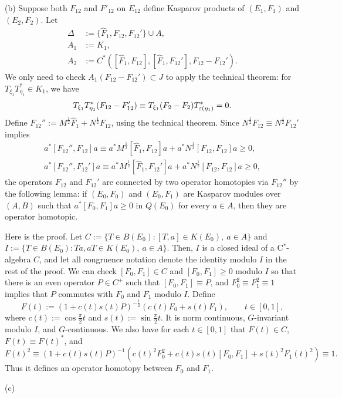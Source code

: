 \documentclass{../../large}
\begin{document}
\begin{pf}
(b)
Suppose both $F_{12}$ and $F'_{12}$ on $E_{12}$ define Kasparov products of $(E_1,F_1)$ and $(E_2,F_2)$.
Let
\begin{align*}
\Delta&:=\{\hat F_1,F_{12},F_{12}'\}\cup A,\\
A_1&:=K_1,\\
A_2&:=C^*([\hat F_1,F_{12}],[\hat F_1,F_{12}'],F_{12}-F_{12}').
\end{align*}
We only need to check $A_1(F_{12}-F_{12}')\subset J$ to apply the technical theorem: for $T_{\xi_1}T_{\eta_1}^*\in K_1$, we have
\[T_{\xi_1}T_{\eta_1}^*(F_{12}-F_{12}')\equiv T_{\xi_1}(F_2-F_2)T_{\varepsilon(\eta_1)}^*=0.\]
Define $F_{12}'':=M^{\frac12}\hat F_1+N^{\frac12}F_{12}$, using the technical theorem.
Since $N^{\frac12}F_{12}\equiv N^{\frac12}F_{12}'$ implies
\begin{align*}
a^*[F_{12}'',F_{12}]a\equiv a^*M^{\frac12}[\hat F_1,F_{12}]a+a^*N^{\frac12}[F_{12},F_{12}]a\ge0,\\
a^*[F_{12}'',F_{12}']a\equiv a^*M^{\frac12}[\hat F_1,F_{12}']a+a^*N^{\frac12}[F_{12},F_{12}]a\ge0,
\end{align*}
the operators $F_{12}$ and $F_{12}'$ are connected by two operator homotopies via $F_{12}''$ by the following lemma: if $(E_0,F_0)$ and $(E_0,F_1)$ are Kasparov modules over $(A,B)$ such that $a^*[F_0,F_1]a\ge0$ in $Q(E_0)$ for every $a\in A$, then they are operator homotopic.



Here is the proof.
Let $C:=\{T\in B(E_0):[T,a]\in K(E_0),\ a\in A\}$ and $I:=\{T\in B(E_0):Ta,aT\in K(E_0),\ a\in A\}$.
Then, $I$ is a closed ideal of a C$^*$-algebra $C$, and let all congruence notation denote the identity modulo $I$ in the rest of the proof.
We can check $[F_0,F_1]\in C$ and $[F_0,F_1]\ge0$ modulo $I$ so that there is an even operator $P\in C^+$ such that $[F_0,F_1]\equiv P$, and $F_0^2\equiv F_1^2\equiv 1$ implies that $P$ commutes with $F_0$ and $F_1$ modulo $I$.
Define
\[F(t):=(1+c(t)s(t)P)^{-\frac12}(c(t)F_0+s(t)F_1),\qquad t\in[0,1],\]
where $c(t):=\cos\frac\pi2t$ and $s(t):=\sin\frac\pi2t$.
It is norm continuous, $G$-invariant modulo $I$, and $G$-continuous.
We also have for each $t\in[0,1]$ that $F(t)\in C$, $F(t)\equiv F(t)^*$, and
\[F(t)^2\equiv(1+c(t)s(t)P)^{-1}(c(t)^2F_0^2+c(t)s(t)[F_0,F_1]+s(t)^2F_1(t)^2)\equiv1.\]
Thus it defines an operator homotopy between $F_0$ and $F_1$.



(c)



\end{pf}
\end{document}
